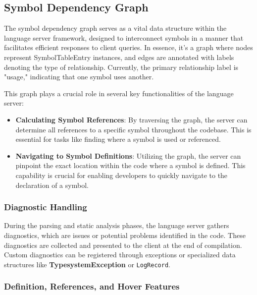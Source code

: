 \subsection{Symbol Dependency Graph}\label{subsec:concept:SymbolDependencyGraph}

The symbol dependency graph serves as a vital data structure within the language server framework, designed to interconnect symbols in a manner that facilitates efficient responses to client queries. In essence, it's a graph where nodes represent SymbolTableEntry instances, and edges are annotated with labels denoting the type of relationship. Currently, the primary relationship label is "usage," indicating that one symbol uses another.

This graph plays a crucial role in several key functionalities of the language server:

\begin{itemize}
    \item \textbf{Calculating Symbol References}: By traversing the graph, the server can determine all references to a specific symbol throughout the codebase. This is essential for tasks like finding where a symbol is used or referenced.
    \item \textbf{Navigating to Symbol Definitions}: Utilizing the graph, the server can pinpoint the exact location within the code where a symbol is defined. This capability is crucial for enabling developers to quickly navigate to the declaration of a symbol.
\end{itemize}

\subsubsection{Diagnostic Handling}\label{subsubsec:concept:DiagnosticHandling}
During the parsing and static analysis phases, the language server gathers diagnostics, which are issues or potential problems identified in the code. These diagnostics are collected and presented to the client at the end of compilation. Custom diagnostics can be registered through exceptions or specialized data structures like \textbf{TypesystemException} or \texttt{LogRecord}.

\subsubsection{Definition, References, and Hover Features}\label{subsubsec:concept:DefinitionReferencesAndHoverFeatures}


